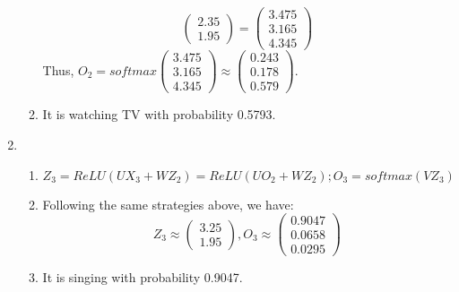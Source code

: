 \documentclass[english]{article}
\begin{document}
\begin{enumerate}
\begin{enumerate}
\[         \begin{pmatrix}
                 2.35 \\
                 1.95
         \end{pmatrix}=
         \begin{pmatrix}
                 3.475 \\
                 3.165 \\
                 4.345
         \end{pmatrix}
         \]
         Thus, $O_2= softmax
         \begin{pmatrix}
                 3.475 \\
                 3.165 \\
                 4.345
         \end{pmatrix} \approx 
         \begin{pmatrix}
                 0.243 \\
                 0.178 \\
                 0.579
         \end{pmatrix}$.
         
        \item It is watching TV with probability 0.5793.
    \end{enumerate}
    \item \begin{enumerate}
        \item $Z_3 = ReLU(UX_3+WZ_2) = ReLU(UO_2+WZ_2); O_3 = softmax(VZ_3)$
        \item Following the same strategies above, we have:
        \[
        Z_3 \approx
        \begin{pmatrix}
                 3.25 \\
                 1.95
         \end{pmatrix}, 
         O_3 \approx
        \begin{pmatrix}
                 0.9047 \\
                 0.0658 \\
                 0.0295
         \end{pmatrix}
        \]
        \item It is singing with probability 0.9047.
    \end{enumerate}
\end{enumerate}
\end{document}
